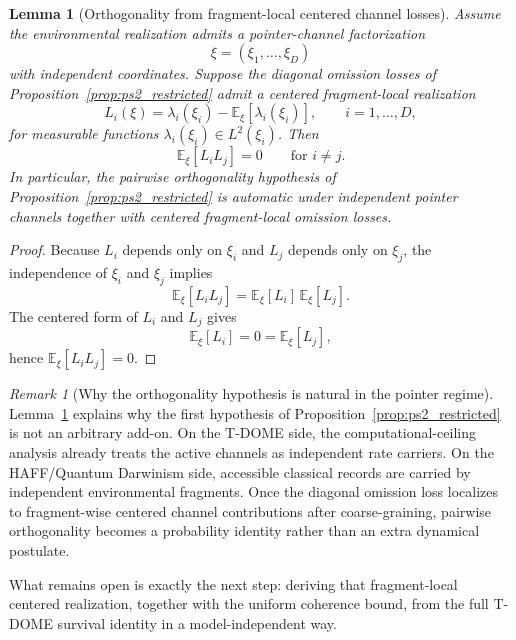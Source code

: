 \documentclass[12pt]{article}
\newtheorem{lemma}[theorem]{Lemma}
\theoremstyle{definition}
\theoremstyle{remark}
\newtheorem{remark}[theorem]{Remark}
\begin{document}
\begin{lemma}[Orthogonality from fragment-local centered channel losses]\label{lem:fragment_orth}
Assume the environmental realization admits a pointer-channel
factorization
\[
\xi=(\xi_1,\dots,\xi_D)
\]
with independent coordinates. Suppose the diagonal omission losses of
Proposition~\ref{prop:ps2_restricted} admit a centered fragment-local
realization
\[
L_i(\xi)
=
\lambda_i(\xi_i)-\mathbb E_\xi[\lambda_i(\xi_i)],
\qquad
i=1,\dots,D,
\]
for measurable functions \(\lambda_i(\xi_i)\in L^2(\xi_i)\). Then
\[
\mathbb E_\xi[L_iL_j]=0
\qquad
\text{for } i\neq j.
\]
In particular, the pairwise orthogonality hypothesis of
Proposition~\ref{prop:ps2_restricted} is automatic under independent
pointer channels together with centered fragment-local omission losses.
\end{lemma}

\begin{proof}
Because \(L_i\) depends only on \(\xi_i\) and \(L_j\) depends only on
\(\xi_j\), the independence of \(\xi_i\) and \(\xi_j\) implies
\[
\mathbb E_\xi[L_iL_j]
=
\mathbb E_\xi[L_i]\,
\mathbb E_\xi[L_j].
\]
The centered form of \(L_i\) and \(L_j\) gives
\[
\mathbb E_\xi[L_i]=0=\mathbb E_\xi[L_j],
\]
hence \(\mathbb E_\xi[L_iL_j]=0\).
\end{proof}

\begin{remark}[Why the orthogonality hypothesis is natural in the pointer regime]
Lemma~\ref{lem:fragment_orth} explains why the first hypothesis of
Proposition~\ref{prop:ps2_restricted} is not an arbitrary add-on. On
the T-DOME side, the computational-ceiling analysis already treats the
active channels as independent rate carriers. On the HAFF/Quantum
Darwinism side, accessible classical records are carried by independent
environmental fragments. Once the diagonal omission loss localizes to
fragment-wise centered channel contributions after coarse-graining,
pairwise orthogonality becomes a probability identity rather than an
extra dynamical postulate.

What remains open is exactly the next step: deriving that fragment-local
centered realization, together with the uniform coherence bound, from
the full T-DOME survival identity in a model-independent way.
\end{remark}
\end{document}
